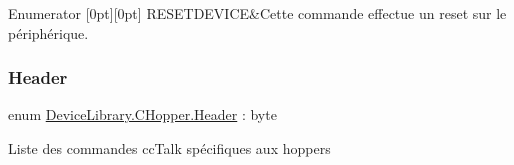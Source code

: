 \begin{DoxyEnumFields}{Enumerator}
[0pt][0pt]{}\mbox{\label{group___header_gga22f8eb6526627d4203e53ce7dbd3052aab87acc3ce509b6e2b20a564607eb06d8}} 
R\+E\+S\+E\+T\+D\+E\+V\+I\+CE&Cette commande effectue un reset sur le périphérique. \\
\hline

\end{DoxyEnumFields}
\mbox{\label{group___header_gab8e15517b29b9562c7d7e8616d61c855}} 
\subsubsection{\texorpdfstring{Header}{Header}\hspace{0.1cm}{\footnotesize\ttfamily [2/3]}}
{\footnotesize\ttfamily enum \mbox{\hyperlink{group___header_gab8e15517b29b9562c7d7e8616d61c855}{Device\+Library.\+C\+Hopper.\+Header}} \+: byte\hspace{0.3cm}{\ttfamily [strong]}}



Liste des commandes cc\+Talk spécifiques aux hoppers 

